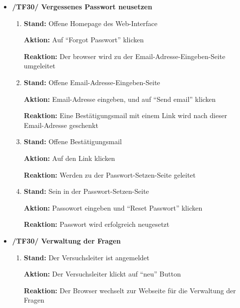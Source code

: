 \documentclass[a4paper]{scrreprt}
\begin{document}
\begin{itemize}
                \item \textbf{/TF30/ Vergessenes Passwort neusetzen}
                    \begin{enumerate}
                        \item \par \textbf{Stand: }Offene Homepage des Web-Interface
                              \par \textbf{Aktion: }Auf ``Forgot Passwort'' klicken
                              \par \textbf{Reaktion: }Der browser wird zu der Email-Adresse-Eingeben-Seite umgeleitet
                        \item \par \textbf{Stand: }Offene Email-Adresse-Eingeben-Seite
                              \par \textbf{Aktion: }Email-Adresse eingeben, und auf ``Send email'' klicken
                              \par \textbf{Reaktion: }Eine Bestätigungsmail mit einem Link wird nach dieser Email-Adresse geschenkt
                        \item \par \textbf{Stand: }Offene Bestätigungsmail
                              \par \textbf{Aktion: }Auf den Link klicken
                              \par \textbf{Reaktion: }Werden zu der Passwort-Setzen-Seite geleitet
                        \item \par \textbf{Stand: }Sein in der Passwort-Setzen-Seite
                              \par \textbf{Aktion: }Passowort eingeben und ``Reset Passwort'' klicken
                              \par \textbf{Reaktion: }Passwort wird erfolgreich neugesetzt
                    \end{enumerate}

                \item \textbf{/TF30/ Verwaltung der Fragen}
                        \begin{enumerate}
                        \item \par \textbf{Stand: } Der Versuchsleiter ist  angemeldet
                              \par \textbf{Aktion: } Der Versuchsleiter klickt auf ``neu'' Button
                              \par \textbf{Reaktion: }  Der Browser wechselt zur Webseite für die Verwaltung der Fragen


\end{enumerate}
\end{itemize}
\end{document}
